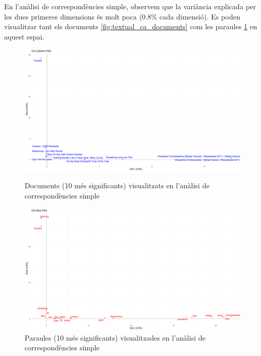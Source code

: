 En l'anàlisi de correspondències simple, observem que la variància explicada per les dues primeres dimensions és molt poca (0.8\% cada dimensió). Es poden visualitzar tant els documents \ref{fig:textual_ca_documents} com les paraules \ref{fig:textual_ca_words} en aquest espai.

\begin{figure}[H]
\centering
    \begin{minipage}{.4\textwidth}
        \centering
        \includegraphics[width=0.95\linewidth]{Images//8_Textual//Analysis/ca_documents_12.png}
        \caption{Documents (10 més significants) visualitzats en l'anàlisi de correspondències simple}
        \label{fig:textual_ca_documents}
    \end{minipage}%
    \begin{minipage}{.4\textwidth}
        \centering
        \includegraphics[width=0.95\linewidth]{Images//8_Textual//Analysis/ca_words_12.png}
        \caption{Paraules (10 més significants) visualitzades en l'anàlisi de correspondències simple}
        \label{fig:textual_ca_words}
    \end{minipage}%
\end{figure}

